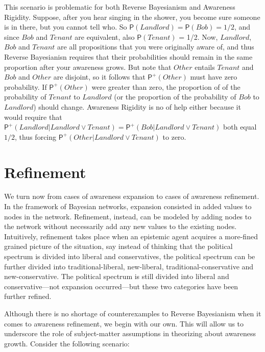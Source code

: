 \documentclass[
  11pt,
  dvipsnames,enabledeprecatedfontcommands]{scrartcl}
\newcommand{\pr}[1]{\ensuremath{\mathsf{P}(#1)}}
\newcommand{\ppr}[2]{\ensuremath{\mathsf{P}^{#1}(#2)}}
\begin{document}
This scenario is problematic for both Reverse Bayesianism and Awareness
Rigidity. Suppose, after you hear singing in the shower, you become sure
someone is in there, but you cannot tell who. So
\(\pr{Landlord} = \pr{Bob} = 1/2\), and since \(Bob\) and \(Tenant\) are
equivalent, also \(\pr{Tenant}\) = 1/2. Now, \(Landlord\), \(Bob\) and
\(Tenant\) are all propositions that you were originally aware of, and
thus Reverse Bayesianisn requires that their probabilities should remain
in the same proportion after your awareness grows. But note that
\(Other\) entails \(Tenant\) and \(Bob\) and \(Other\) are disjoint, so
it follows that \(\ppr{+}{Other}\) must have zero probability. If
\(\ppr{+}{Other}\) were greater than zero, the proportion of of the
probability of \(Tenant\) to \(Landlord\) (or the proportion of the
probability of \(Bob\) to \(Landlord\)) should change. Awareness
Rigidity is no of help either because it would require that
\(\ppr{+}{Landlord \vert Landlord \vee Tenant}=\ppr{+}{Bob \vert Landlord \vee Tenant}\)
both equal \(1/2\), thus forcing
\(\ppr{+}{Other \vert Landlord \vee Tenant}\) to zero.

\hypertarget{refinement}{%
\section{Refinement}\label{refinement}}

\label{sec:structural-both}

We turn now from cases of awareness expansion to cases of awareness
refinement. In the framework of Bayesian networks, expansion consisted
in added values to nodes in the network. Refinement, instead, can be
modeled by adding nodes to the network without necessarily add any new
values to the existing nodes. Intuitively, refinement takes place when
an epistemic agent acquires a more-fined grained picture of the
situation, say instead of thinking that the political spectrum is
divided into liberal and conservatives, the political spectrum can be
further divided into traditional-liberal, new-liberal,
traditional-conservative and new-conservative. The political spectrum is
still divided into liberal and conservative---not expansion
occurred---but these two categories have been further refined.

Although there is no shortage of counterexamples to Reverse Bayesianism
when it comes to awareness refinement, we begin with our own. This will
allow us to underscore the role of subject-matter assumptions in
theorizing about awareness growth. Consider the following scenario:
\end{document}
